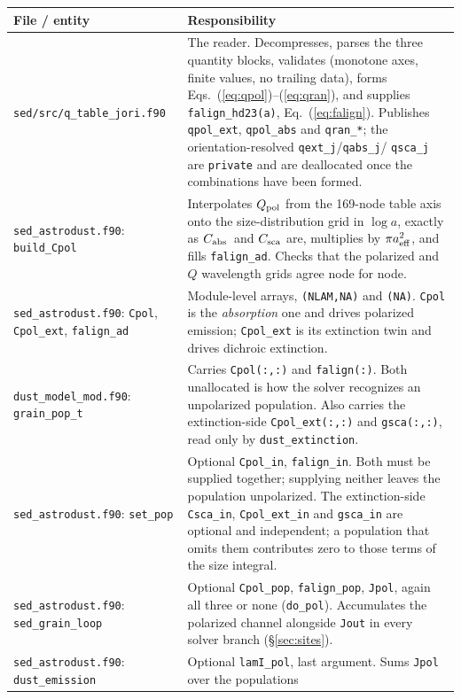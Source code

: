 \documentclass{my_memo}
\newcommand{\code}[1]{\texttt{#1}}
\newcommand{\Cabs}{\ensuremath{C_{\rm abs}}}
\begin{document}
\begin{table}[h]
\centering
\small
\begin{tabular}{@{}p{}p{}@{}}
\toprule
File / entity & Responsibility \\
\midrule
\code{sed/src/q\_table\_jori.f90} &
The reader. Decompresses, parses the three quantity blocks, validates
(monotone axes, finite values, no trailing data), forms
Eqs.~(\ref{eq:qpol})--(\ref{eq:qran}), and supplies \code{falign\_hd23(a)},
Eq.~(\ref{eq:falign}). Publishes \code{qpol\_ext}, \code{qpol\_abs} and
\code{qran\_*}; the orientation-resolved \code{qext\_j}/\code{qabs\_j}/%
\code{qsca\_j} are \code{private} and are deallocated once the combinations
have been formed. \\[2pt]
\code{sed\_astrodust.f90}: \code{build\_Cpol} &
Interpolates $Q_{\rm pol}$ from the 169-node table axis onto the
size-distribution grid in $\log a$, exactly as \Cabs\ and $C_{\rm sca}$ are,
multiplies by $\pi a_{\rm eff}^2$, and fills \code{falign\_ad}. Checks that the
polarized and $Q$ wavelength grids agree node for node. \\[2pt]
\code{sed\_astrodust.f90}: \code{Cpol}, \code{Cpol\_ext}, \code{falign\_ad} &
Module-level arrays, \code{(NLAM,NA)} and \code{(NA)}. \code{Cpol} is the
\emph{absorption} one and drives polarized emission; \code{Cpol\_ext} is its
extinction twin and drives dichroic extinction. \\[2pt]
\code{dust\_model\_mod.f90}: \code{grain\_pop\_t} &
Carries \code{Cpol(:,:)} and \code{falign(:)}. Both unallocated is how the
solver recognizes an unpolarized population. Also carries the extinction-side
\code{Cpol\_ext(:,:)} and \code{gsca(:,:)}, read only by
\code{dust\_extinction}. \\[2pt]
\code{sed\_astrodust.f90}: \code{set\_pop} &
Optional \code{Cpol\_in}, \code{falign\_in}. Both must be supplied together;
supplying neither leaves the population unpolarized. The extinction-side
\code{Csca\_in}, \code{Cpol\_ext\_in} and \code{gsca\_in} are optional and
independent; a population that omits them contributes zero to those terms of
the size integral. \\[2pt]
\code{sed\_astrodust.f90}: \code{sed\_grain\_loop} &
Optional \code{Cpol\_pop}, \code{falign\_pop}, \code{Jpol}, again all three or
none (\code{do\_pol}). Accumulates the polarized channel alongside \code{Jout}
in every solver branch (\S\ref{sec:sites}). \\[2pt]
\code{sed\_astrodust.f90}: \code{dust\_emission} &
Optional \code{lamI\_pol}, last argument. Sums \code{Jpol} over the populations

\end{tabular}
\end{table}
\end{document}
